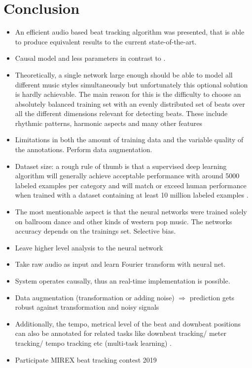 \documentclass{scrartcl}
\begin{document}
\newpage 

\section{Conclusion}
\label{sec:conclusion}

\begin{itemize}
\item An efficient audio based beat tracking algorithm was presented, that is able to produce equivalent results to the current state-of-the-art. 
\item Causal model and less parameters in contrast to \cite{Boeck2014}.
\item Theoretically, a single network large enough should be able to model all different music styles simultaneously but unfortunately this optional solution is hardly achievable. The main reason for this is the difficulty to choose an absolutely balanced training set with an evenly distributed set of beats over all the different dimensions relevant for detecting beats. These include rhythmic patterns, harmonic aspects and many other features
\item Limitations in both the amount of training data and the variable quality of the annotations. Perform data augmentation. 
\item Dataset size: a rough rule of thumb is that a supervised deep learning algorithm will generally achieve acceptable performance with around 5000 labeled examples per category and will match or exceed human performance when trained with a dataset containing at least 10 million labeled examples \cite{Goodfellow2016}.
\item The most mentionable aspect is that the neural networks were trained solely on ballroom dance and other kinds of western pop music. The networks accuracy depends on the trainings set. Selective bias. 
\item Leave higher level analysis to the neural network
\item Take raw audio as input and learn Fourier transform with neural net.
\item System operates causally, thus an real-time implementation is possible.
\item Data augmentation (transformation or adding noise) $\Rightarrow$ prediction gets robust against transformation and noisy signals
\item Additionally, the tempo, metrical level of the beat and downbeat positions can also be annotated for related tasks like downbeat tracking/ meter tracking/ tempo tracking etc (multi-task learning) \cite{Boeck2019}.
\item Participate MIREX beat tracking contest 2019
\end{itemize}
\end{document}
